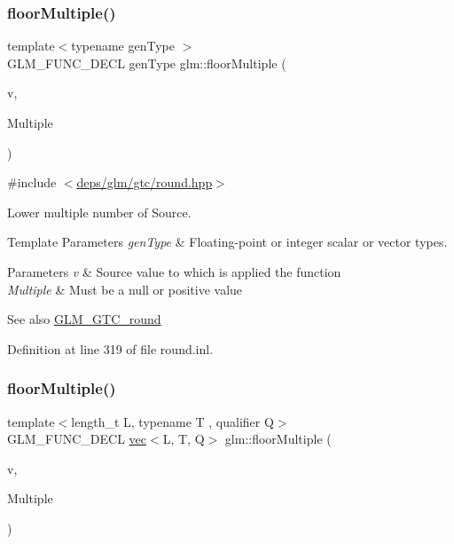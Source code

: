 \subsubsection{\texorpdfstring{floor\+Multiple()}{floorMultiple()}\hspace{0.1cm}{\footnotesize\ttfamily [1/2]}}
{\footnotesize\ttfamily template$<$typename gen\+Type $>$ \\
G\+L\+M\+\_\+\+F\+U\+N\+C\+\_\+\+D\+E\+CL gen\+Type glm\+::floor\+Multiple (\begin{DoxyParamCaption}\item[{gen\+Type}]{v,  }\item[{gen\+Type}]{Multiple }\end{DoxyParamCaption})}



{\ttfamily \#include $<$\hyperlink{round_8hpp}{deps/glm/gtc/round.\+hpp}$>$}

Lower multiple number of Source.


\begin{DoxyTemplParams}{Template Parameters}
{\em gen\+Type} & Floating-\/point or integer scalar or vector types.\\
\hline
\end{DoxyTemplParams}

\begin{DoxyParams}{Parameters}
{\em v} & Source value to which is applied the function \\
\hline
{\em Multiple} & Must be a null or positive value\\
\hline
\end{DoxyParams}
\begin{DoxySeeAlso}{See also}
\hyperlink{group__gtc__round}{G\+L\+M\+\_\+\+G\+T\+C\+\_\+round} 
\end{DoxySeeAlso}


Definition at line 319 of file round.\+inl.

\mbox{\label{group__gtc__round_gacdd8901448f51f0b192380e422fae3e4}} 
\subsubsection{\texorpdfstring{floor\+Multiple()}{floorMultiple()}\hspace{0.1cm}{\footnotesize\ttfamily [2/2]}}
{\footnotesize\ttfamily template$<$length\+\_\+t L, typename T , qualifier Q$>$ \\
G\+L\+M\+\_\+\+F\+U\+N\+C\+\_\+\+D\+E\+CL \hyperlink{structglm_1_1vec}{vec}$<$L, T, Q$>$ glm\+::floor\+Multiple (\begin{DoxyParamCaption}\item[{\hyperlink{structglm_1_1vec}{vec}$<$ L, T, Q $>$ const \&}]{v,  }\item[{\hyperlink{structglm_1_1vec}{vec}$<$ L, T, Q $>$ const \&}]{Multiple }\end{DoxyParamCaption})}



